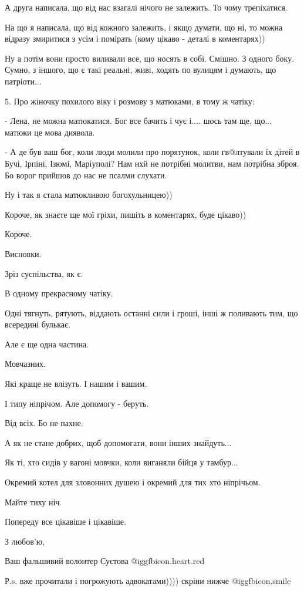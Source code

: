 А друга написала, що від нас взагалі нічого не залежить. То чому трепіхатися.

На що я написала, що від кожного залежить, і якщо думати, що ні, то можна
відразу змиритися з усім і помірать
 (кому цікаво  - деталі в коментарях))

Ну а потім вони просто виливали все, що носять в собі. 
Смішно. З одного боку.
Сумно, з іншого, що є такі реальні, живі, ходять по вулицям і думають, що патріоти...

5. Про жіночку похилого віку і розмову з матюками, в тому ж чатіку:

- Лена, не можна матюкатися. Бог все бачить і чує і.... шось там ще, що...
матюки це мова диявола.

- А де був ваш бог, коли люди молили про порятунок, коли гв@лтували їх дітей в
Бучі, Ірпіні, Ізюмі, Маріуполі? Нам нхй не потрібні молитви, нам потрібна
зброя. Бо ворог прийшов до нас не псалми слухати.

Ну і так я стала матюкливою богохульницею))

Короче, як знаєте ще мої гріхи, пишіть в коментарях, буде цікаво))

Короче.

Висновки.

Зріз суспільства, як є. 

В одному прекрасному чатіку.

Одні тягнуть, рятують, віддають останні сили і гроші, інші ж поливають тим, що
всередині булькає.

Але є ще одна частина.

Мовчазних. 

Які краще не влізуть. І нашим і вашим.

І типу ніпрічом. Але допомогу - беруть. 

Від всіх. Бо не пахне.

А як не стане добрих, щоб допомогати, вони інших знайдуть...

Як ті, хто сидів у вагоні мовчки, коли виганяли бійця у тамбур... 

Окремий котел для зловонних душею і окремий для тих хто ніпрічьом.

Майте тиху ніч. 

Попереду все цікавіше і цікавіше.

З любов'ю,  

Ваш фальшивий волонтер Суєтова @igg{fbicon.heart.red}

Р.s. вже прочитали і погрожують адвокатами)))) скріни нижче
@igg{fbicon.smile} 


